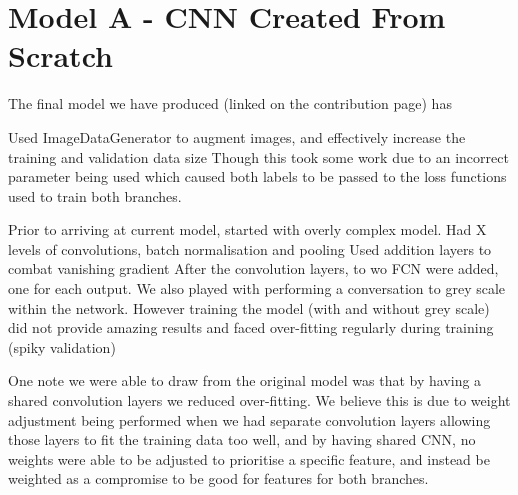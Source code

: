 





\section{Model A - CNN Created From Scratch}
The final model we have produced (linked on the contribution page) has 

Used ImageDataGenerator to augment images, and effectively increase the training and validation data size
Though this took some work due to an incorrect parameter being used which caused both labels to be passed to the loss functions used to train both branches.

Prior to arriving at current model, started with overly complex model.
Had X levels of convolutions, batch normalisation and pooling
Used addition layers to combat vanishing gradient
After the convolution layers, to wo FCN were added, one for each output.
We also played with performing a conversation to grey scale within the network.
However training the model (with and without grey scale) did not provide amazing results and faced over-fitting regularly during training (spiky validation)

One note we were able to draw from the original model was that by having a shared convolution layers we reduced over-fitting.
We believe this is due to weight adjustment being performed when we had separate convolution layers allowing those layers to fit the training data too well, and by having shared CNN, no weights were able to be adjusted to prioritise a specific feature, and instead be weighted as a compromise to be good for features for both branches.

